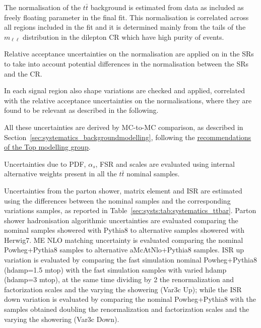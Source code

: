 The normalisation of the $t\bar{t}$ background is estimated 
from data as included as freely floating parameter in the final fit. 
This normalisation is correlated across all regions included in the fit and it is determined mainly from the tails of the $m_{\ell\ell}$ distribution in the dilepton CR which have high purity of \ttbar events.

Relative acceptance uncertainties on the normalisation are applied on 
\ttbar in the SRs
to take into account potential differences in the normalisation 
between the SRs and the CR. 

In each signal region also shape variations are checked 
and applied, correlated with the relative acceptance uncertainties on the normalisations, where they are found to be relevant as described in the following. 

All these uncertainties are derived by MC-to-MC comparison, 
as described in Section~\ref{sec:systematics_backgroundmodelling}, 
following the 
\href{https://twiki.cern.ch/twiki/bin/view/AtlasProtected/TopMCSystematicsR21}{\underline{recommendations of the Top modelling group}}. 

Uncertainties due to PDF, $\alpha_s$, FSR and scales 
are evaluated using internal alternative weights present in all the $t\bar{t}$ nominal samples. 

Uncertainties from the parton shower, 
matrix element and ISR are estimated using 
the differences between the nominal samples and 
the corresponding variations samples, as reported in Table~\ref{sec:systs:tab:systematics_ttbar}. 
Parton shower hadronisation algorithmic uncertainties 
are evaluated comparing the nominal samples showered with Pythia8 
to alternative samples showered with Herwig7. 
ME NLO matching uncertainty is evaluated comparing 
the nominal Powheg+Pythia8 samples to alternative aMcAtNlo+Pythia8 samples. 
ISR up variation is evaluated by comparing the 
fast simulation nominal Powheg+Pythia8 (hdamp=1.5 mtop) with 
the fast simulation samples with varied hdamp (hdamp=3 mtop), 
at the same time dividing by 2 the renormalization 
and factorization scales and the varying the showering (Var3c Up); 
while the ISR down variation is evaluated by comparing 
the nominal Powheg+Pythia8 with the samples obtained 
doubling the renormalization and factorization scales and the varying the showering (Var3c Down).


